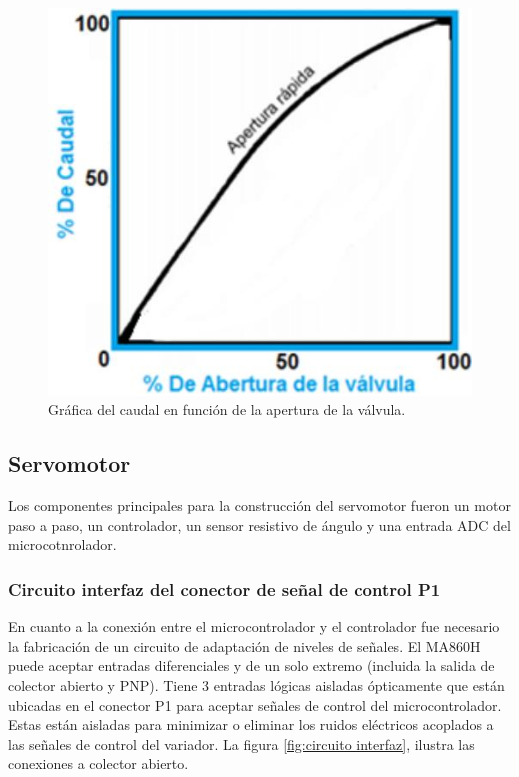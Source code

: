 \begin{figure}[h]
\centering
\includegraphics[scale=.60]{./Figures/funcion-valvula.jpeg}
\caption{Gráfica del caudal en función de la apertura de la válvula.}
\label{fig:grafica caudal vs. apertura de valvula}
\end{figure}

\subsection{Servomotor}
\label{subsec:Servomotor}

Los componentes principales para la construcción del servomotor fueron un motor paso a paso, un controlador, un sensor resistivo de ángulo y una entrada ADC del microcotnrolador.


\subsubsection{Circuito interfaz del conector de señal de control P1}

En cuanto a la conexión entre el microcontrolador y el controlador fue necesario la fabricación de un circuito de adaptación de niveles de señales. El MA860H puede aceptar entradas diferenciales y de un solo extremo (incluida la salida de colector abierto y PNP). Tiene 3 entradas lógicas aisladas ópticamente que están ubicadas en el conector P1 para aceptar señales de control del microcontrolador. Estas están aisladas para minimizar o eliminar los ruidos eléctricos acoplados a las señales de control del variador. La figura \ref{fig:circuito interfaz}, ilustra las conexiones a colector abierto.

